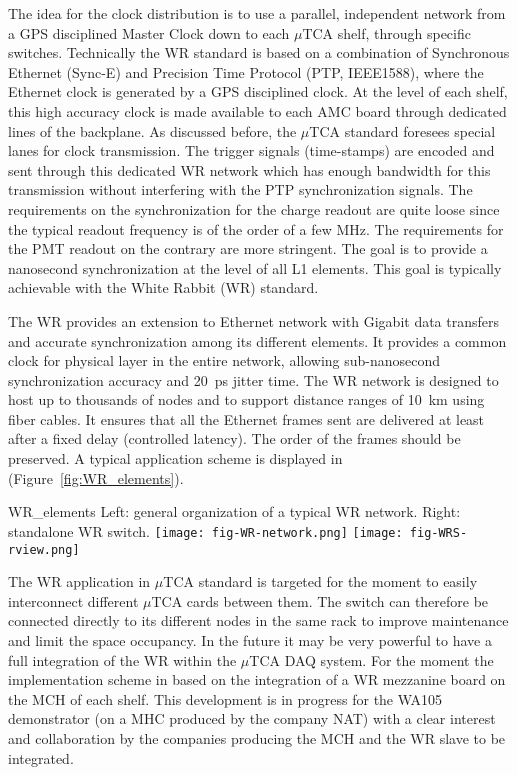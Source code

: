 The idea for the clock distribution is to use a parallel, independent
network from a GPS disciplined Master Clock down to each $\mu$TCA
shelf, through specific switches. Technically the WR standard is based
on a combination of Synchronous Ethernet (Sync-E) and Precision Time
Protocol (PTP, IEEE1588), where the Ethernet clock is generated by a
GPS disciplined clock. At the level of each shelf, this high accuracy
clock is made available to each AMC board through dedicated lines of
the backplane. As discussed before, the $\mu$TCA standard foresees
special lanes for clock transmission. The trigger signals
(time-stamps) are encoded and sent through this dedicated WR network
which has enough bandwidth for this transmission without interfering
with the PTP synchronization signals. The requirements on the
synchronization for the charge readout are quite loose since the
typical readout frequency is of the order of a few MHz. The
requirements for the PMT readout on the contrary are more
stringent. The goal is to provide a nanosecond synchronization at the
level of all L1 elements. This goal is typically achievable with the
White Rabbit (WR) standard\cite{WR-standard}.

The WR provides an extension to Ethernet network with Gigabit data
transfers and accurate synchronization among its different
elements. It provides a common clock for physical layer in the entire
network, allowing sub-nanosecond synchronization accuracy and 20~ps
jitter time. The WR network is designed to host up to thousands of
nodes and to support distance ranges of 10~km using fiber cables. It
ensures that all the Ethernet frames sent are delivered at least after
a fixed delay (controlled latency). The order of the frames should be
preserved.  A typical application scheme is displayed in
(Figure~\ref{fig:WR_elements}).
\begin{cdrfigure}{WR_elements}
{\small Left: general organization of a typical WR network. Right: standalone WR switch.}
\texttt{[image: fig-WR-network.png]}
\texttt{[image: fig-WRS-rview.png]}
\end{cdrfigure}

The WR application in $\mu$TCA standard is targeted for the moment to
easily interconnect different $\mu$TCA cards between them. The switch
can therefore be connected directly to its different nodes in the same
rack to improve maintenance and limit the space occupancy. In the
future it may be very powerful to have a full integration of the WR
within the $\mu$TCA DAQ system. For the moment the implementation
scheme in based on the integration of a WR mezzanine board on the MCH
of each shelf. This development is in progress for the WA105
demonstrator (on a MHC produced by the company NAT) with a clear
interest and collaboration by the companies producing the MCH and the
WR slave to be integrated.
